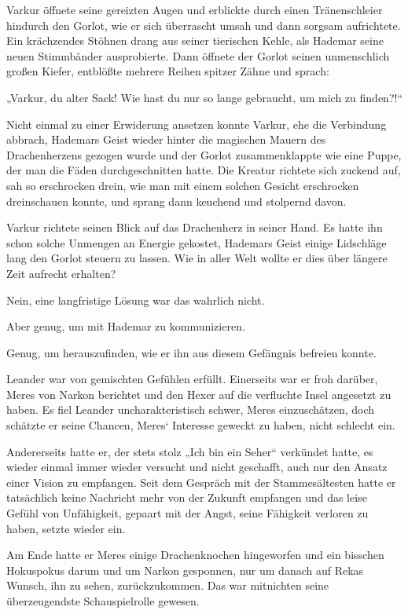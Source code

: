 \documentclass[10pt, a4paper, oneside]{book}
\begin{document}
Varkur öffnete seine gereizten Augen und erblickte durch einen Tränenschleier hindurch den Gorlot, wie er sich überrascht umsah und dann sorgsam aufrichtete. Ein krächzendes Stöhnen drang aus seiner tierischen Kehle, als Hademar seine neuen Stimmbänder ausprobierte. Dann öffnete der Gorlot seinen unmenschlich großen Kiefer, entblößte mehrere Reihen spitzer Zähne und sprach:

„Varkur, du alter Sack! Wie hast du nur so lange gebraucht, um mich zu finden?!“

Nicht einmal zu einer Erwiderung ansetzen konnte Varkur, ehe die Verbindung abbrach, Hademars Geist wieder hinter die magischen Mauern des Drachenherzens gezogen wurde und der Gorlot zusammenklappte wie eine Puppe, der man die Fäden durchgeschnitten hatte. Die Kreatur richtete sich zuckend auf, sah so erschrocken drein, wie man mit einem solchen Gesicht erschrocken dreinschauen konnte, und sprang dann keuchend und stolpernd davon.

Varkur richtete seinen Blick auf das Drachenherz in seiner Hand. Es hatte ihn schon solche Unmengen an Energie gekostet, Hademars Geist einige Lidschläge lang den Gorlot steuern zu lassen. Wie in aller Welt wollte er dies über längere Zeit aufrecht erhalten?

Nein, eine langfristige Lösung war das wahrlich nicht.

Aber genug, um mit Hademar zu kommunizieren.

Genug, um herauszufinden, wie er ihn aus diesem Gefängnis befreien konnte.\bigskip







Leander war von gemischten Gefühlen erfüllt. Einerseits war er froh darüber, Meres von Narkon berichtet und den Hexer auf die verfluchte Insel angesetzt zu haben. Es fiel Leander uncharakteristisch schwer, Meres einzuschätzen, doch schätzte er seine Chancen, Meres‘ Interesse geweckt zu haben, nicht schlecht ein.

Andererseits hatte er, der stets stolz „Ich bin ein Seher“ verkündet hatte, es wieder einmal immer wieder versucht und nicht geschafft, auch nur den Ansatz einer Vision zu empfangen. Seit dem Gespräch mit der Stammesältesten hatte er tatsächlich keine Nachricht mehr von der Zukunft empfangen und das leise Gefühl von Unfähigkeit, gepaart mit der Angst, seine Fähigkeit verloren zu haben, setzte wieder ein.

Am Ende hatte er Meres einige Drachenknochen hingeworfen und ein bisschen Hokuspokus darum und um Narkon gesponnen, nur um danach auf Rekas Wunsch, ihn zu sehen, zurückzukommen. Das war mitnichten seine überzeugendste Schauspielrolle gewesen.
\end{document}

